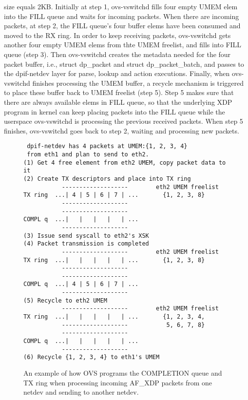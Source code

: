 \documentclass[10pt]{sigplanconf}
\begin{document}
size equals 2KB.  Initially at step 1, ovs-vswitchd fills four empty UMEM elem into
the FILL queue and waits for incoming packets.  When there are incoming packets,
at step 2, the FILL queue's four buffer elems have been consumed and moved
to the RX ring.  In order to keep receiving packets, ovs-vswitchd gets another
four empty UMEM elems from thte UMEM freelist, and fills into FILL queue (step 3).
Then ovs-vswitchd creates the metadata needed for the four packet
buffer, i.e., struct dp\_packet and struct dp\_packet\_batch, and passes to 
the dpif-netdev layer for parse, lookup and action executions.
Finally, when ovs-vswitchd finishes processing the UMEM buffer, a recycle
mechanism is triggered to place these buffer back to UMEM freelist (step 5).
Step 5 makes sure that there are always available elems in FILL queue, so
that the underlying XDP program in kernel can keep placing packets into
the FILL queue while the userspace ovs-vswitchd is processing the previous
received packets.
When step 5 finishes, ovs-vswitchd goes back to step 2, waiting and processing
new packets.

\begin{figure}
{\scriptsize
\begin{verbatim}
 dpif-netdev has 4 packets at UMEM:{1, 2, 3, 4}
 from eth1 and plan to send to eth2.
(1) Get 4 free element from eth2 UMEM, copy packet data to it
(2) Create TX descriptors and place into TX ring
           -------------------        eth2 UMEM freelist
TX ring  ...| 4 | 5 | 6 | 7 | ...       {1, 2, 3, 8}
           -------------------
           -------------------
COMPL q  ...|   |   |   |   | ...
           -------------------
(3) Issue send syscall to eth2's XSK
(4) Packet transmission is completed
           -------------------        eth2 UMEM freelist
TX ring  ...|   |   |   |   | ...       {1, 2, 3, 8}
           -------------------
           -------------------
COMPL q  ...| 4 | 5 | 6 | 7 | ...
           -------------------
(5) Recycle to eth2 UMEM
           -------------------        eth2 UMEM freelist
TX ring  ...|   |   |   |   | ...       {1, 2, 3, 4,
           -------------------           5, 6, 7, 8}
           -------------------
COMPL q  ...|   |   |   |   | ...
           -------------------
(6) Recycle {1, 2, 3, 4} to eth1's UMEM 
\end{verbatim}
}
\vspace{-1.0em}
\caption{An example of how OVS programs the COMPLETION queue and TX ring when
processing incoming AF\_XDP packets from one netdev and sending to another netdev.}
\label{afxdptx}
\vspace{-1.0em}
\end{figure}
\end{document}
